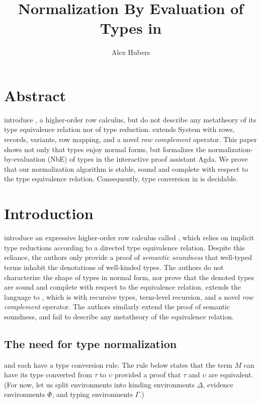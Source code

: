 \documentclass[sigplan,10pt,review]{acmart}\settopmatter{printfolios=true,printccs=false,printacmref=false}
\title{Normalization By Evaluation of Types in \Rome}
\author{Alex Hubers}
\affiliation{
  \department{Department of Computer Science}
  \institution{The University of Iowa}
  \streetaddress{14 MacLean Hall}
  \city{Iowa City}
  \state{Iowa}
  \country{USA}}
\begin{document}
\InlineOn{}

\maketitle

\section*{Abstract}
\citet{HubersIMM24} introduce \Rome, a higher-order row calculus, but do not describe any metatheory of its type equivalence relation nor of type reduction. \Rome extends System \Fome with rows, records, variants, row mapping, and a novel \emph{row complement} operator. This paper shows not only that \Rome types enjoy normal forms, but formalizes the normaliz\-ation\--by\--evaluation (NbE) of types in the interactive proof assistant Agda. We prove that our normalization algorithm is stable, sound and complete with respect to the type equivalence relation. Consequently, type conversion in \Rome is decidable.

\section{Introduction}
\citet{HubersM23} introduce an expressive higher-order row calculus called \RO, which relies on implicit type reductions according to a directed type equivalence relation. Despite this reliance, the authors only provide a proof of \emph{semantic soundness} that well-typed terms inhabit the denotations of well-kinded types. The authors do not characterize the shape of types in normal form, nor prove that the denoted types are sound and complete with respect to the equivalence relation. \citet{HubersIMM24} extends the \RO language to \Rome, which is \RO with recursive types, term-level recursion, and a novel \emph{row complement} operator. The authors similarly extend the proof of semantic soundness, and fail to describe any metatheory of the equivalence relation.

\subsection{The need for type normalization}
\label{sec:need-for-type-normalization}
\RO and \Rome each have a type conversion rule. The rule below states that the term $M$ can have its type converted from $\tau$ to $\upsilon$ provided a proof that $\tau$ and $\upsilon$ are equivalent. (For now, let us split environments into kinding environments $\Delta$, evidence environments $\Phi$, and typing environments $\Gamma$.)
\end{document}
